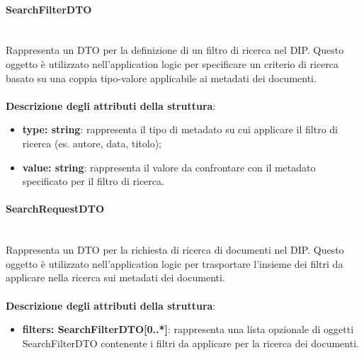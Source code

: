 \documentclass[a4paper,12pt]{article}
\begin{document}
{{{                \paragraph{SearchFilterDTO}\label{par:SearchFilterDTO}\mbox{}\\
                Rappresenta un DTO per la definizione di un filtro di ricerca nel DIP. Questo oggetto è utilizzato nell'application logic per specificare un criterio di ricerca basato su una coppia tipo-valore applicabile ai metadati dei documenti.\\
                \\
                \textbf{Descrizione degli attributi della struttura}:
                \begin{itemize}
                    \item \textbf{type: string}: rappresenta il tipo di metadato su cui applicare il filtro di ricerca (es. autore, data, titolo);
                    \item \textbf{value: string}: rappresenta il valore da confrontare con il metadato specificato per il filtro di ricerca.
                \end{itemize}

                \paragraph{SearchRequestDTO}\label{par:SearchRequestDTO}\mbox{}\\
                Rappresenta un DTO per la richiesta di ricerca di documenti nel DIP. Questo oggetto è utilizzato nell'application logic per trasportare l'insieme dei filtri da applicare nella ricerca sui metadati dei documenti.\\
                \\
                \textbf{Descrizione degli attributi della struttura}:
                \begin{itemize}
                    \item \textbf{filters: SearchFilterDTO[0..*]}: rappresenta una lista opzionale di oggetti SearchFilterDTO contenente i filtri da applicare per la ricerca dei documenti.
                \end{itemize}
}}}
\end{document}
